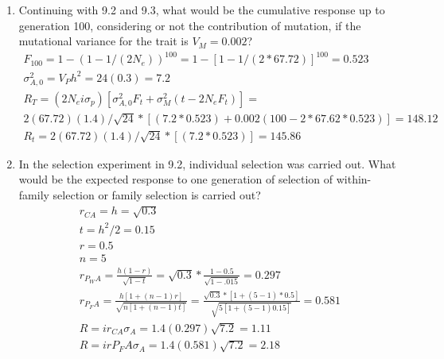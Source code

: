 \documentclass[12pt]{amsart}
\begin{document}
\begin{enumerate}
\item Continuing with 9.2 and 9.3, what would be the cumulative response up to generation 100, considering or not the contribution of mutation, if the mutational variance for the trait is $V_M = 0.002$? \\
\begin{gather*}
F_{100} = 1 - (1 - 1/(2N_e))^{100} = 1 - [1-1/(2*67.72)]^{100} = 0.523 \\
\sigma^2_{A,0} = V_Ph^2 = 24(0.3) = 7.2 \\
R_T= (2N_ei\sigma_p)[\sigma^2_{A,0}F_t + \sigma^2_M(t-2N_eF_t)] = \\
2(67.72)(1.4)/\sqrt{24}*[(7.2*0.523) + 0.002(100-2*67.62*0.523)] = 148.12\\
R_t = 2(67.72)(1.4)/\sqrt{24}*[(7.2*0.523)] = 145.86
\end{gather*}

\item In the selection experiment in 9.2, individual selection was carried out. What would be the expected response to one generation of selection of within-family selection or family selection is carried out?\\
\begin{gather*}
r_{CA} = h = \sqrt{0.3}\\
t = h^2/2 = 0.15\\
r = 0.5\\
n = 5\\
r_{P_WA} = \frac{h(1-r)}{\sqrt{1-t}} = \sqrt{0.3}*\frac{1-0.5}{\sqrt{1-.015}} = 0.297\\
r_{P_FA} = \frac{h[1+(n-1)r]}{\sqrt{n[1+(n-1)t]}} = \frac{\sqrt{0.3}*[1+(5-1)*0.5]}{\sqrt{5[1+(5-1)0.15]}} = 0.581\\
R = ir_{CA}\sigma_A = 1.4(0.297)\sqrt{7.2} = 1.11\\
R = ir{P_FA}\sigma_A = 1.4(0.581)\sqrt{7.2} = 2.18
\end{gather*}

\end{enumerate}
\end{document}
